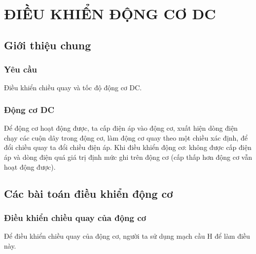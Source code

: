 \chapter{ĐIỀU KHIỂN ĐỘNG CƠ DC}
\section{Giới thiệu chung}
\subsection{Yêu cầu}Điều khiển chiều quay và tốc độ động cơ DC.
\subsection{Động cơ DC}
Để động cơ hoạt động được, ta cấp điện áp vào động cơ, xuất hiện dòng điện chạy các cuộn dây trong động cơ, làm động cơ quay theo một chiều xác định, để đổi chiều quay ta đổi chiều điện áp. Khi điều khiển động cơ: không được cấp điện áp và dòng điện quá giá trị định mức ghi trên động cơ (cấp thấp hơn động cơ vẫn hoạt động được).
\section{Các bài toán điều khiển động cơ}
\subsection{Điều khiển chiều quay của động cơ}
Để điều khiển chiều quay của động cơ, người ta sử dụng mạch cầu H để làm điều này.

